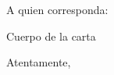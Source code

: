 \documentclass{letter}
\begin{document}
\begin{letter}{}

\opening{\noindent A quien corresponda:}

Cuerpo de la carta

\closing{Atentamente,}

\end{letter}
\end{document}
